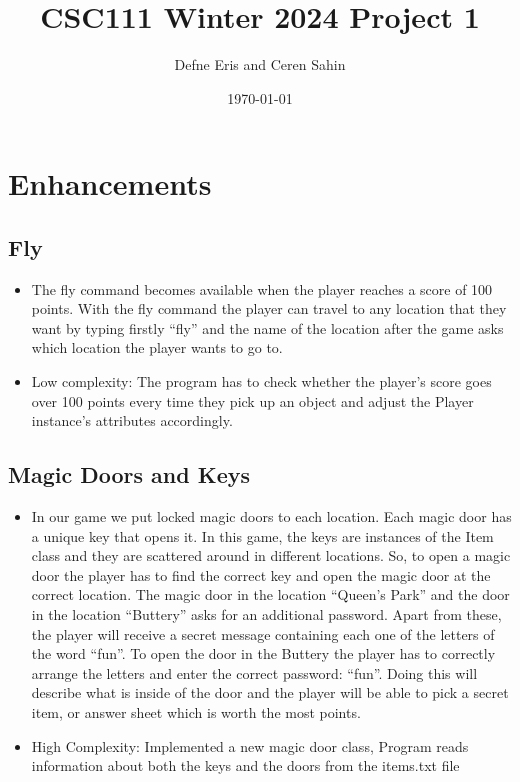 \documentclass[11pt]{article}
\title{CSC111 Winter 2024 Project 1}
\author{Defne Eris and Ceren Sahin}
\date{\today}
\begin{document}
\maketitle

\section*{Enhancements}


\begin{enumerate}

\subsection*{Fly}
\begin{itemize}
    \item The fly command becomes available when the player reaches a score of 100 points. With the fly command the player can travel to any location that they want by typing firstly “fly” and the name of the location after the game asks which location the player wants to go to.
    \item Low complexity: The program has to check whether the player’s score goes over 100 points every time they pick up an object and adjust the Player instance's attributes accordingly.
\end{itemize}
\subsection*{Magic Doors and Keys}
\begin{itemize}
    \item In our game we put locked magic doors to each location. Each magic door has a unique key that opens it. In this game, the keys are instances of the Item class and they are scattered around in different locations. So, to open a magic door the player has to find the correct key and open the magic door at the correct location. The magic door in the location “Queen’s Park” and the door in the location “Buttery” asks for an additional password. Apart from these, the player will receive a secret message containing each one of the letters of the word “fun”. To open the door in the Buttery the player has to correctly arrange the letters and enter the correct password: “fun”. Doing this will describe what is inside of the door and the player will be able to pick a secret item, or answer sheet which is worth the most points.
    \item High Complexity:  Implemented a new magic door class, Program reads information about both the keys and the doors from the items.txt file
\end{itemize}

\end{enumerate}
\end{document}
